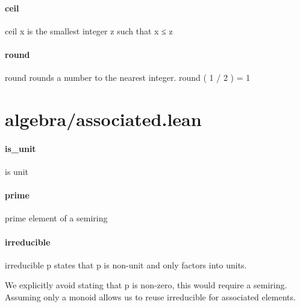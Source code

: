 \documentclass{article}
\begin{document}
\paragraph{ceil}
\par
\colorbox[RGB]{253,246,227}{{{{\color[RGB]{101, 123, 131} ceil x }}}} is the smallest integer 
\colorbox[RGB]{253,246,227}{{{{\color[RGB]{101, 123, 131} z }}}} such that 
\colorbox[RGB]{253,246,227}{{{{\color[RGB]{101, 123, 131} x  }}}{{{\color[RGB]{181, 137, 0} ≤ }}}{{{\color[RGB]{101, 123, 131}  z }}}}\paragraph{round}
\par
\colorbox[RGB]{253,246,227}{{{{\color[RGB]{101, 123, 131} round }}}} rounds a number to the nearest integer. 
\colorbox[RGB]{253,246,227}{{{{\color[RGB]{101, 123, 131} round ( }}}{{{\color[RGB]{108, 113, 196} 1 }}}{{{\color[RGB]{101, 123, 131}   }}}{{{\color[RGB]{181, 137, 0} / }}}{{{\color[RGB]{101, 123, 131}   }}}{{{\color[RGB]{108, 113, 196} 2 }}}{{{\color[RGB]{101, 123, 131} )  }}}{{{\color[RGB]{181, 137, 0} = }}}{{{\color[RGB]{101, 123, 131}   }}}{{{\color[RGB]{108, 113, 196} 1 }}}}\section{algebra/associated.lean}\paragraph{is\_unit}
\par
is unit
\paragraph{prime}
\par
prime element of a semiring
\paragraph{irreducible}
\par
\colorbox[RGB]{253,246,227}{{{{\color[RGB]{101, 123, 131} irreducible p }}}} states that 
\colorbox[RGB]{253,246,227}{{{{\color[RGB]{101, 123, 131} p }}}} is non-unit and only factors into units.
\par
We explicitly avoid stating that 
\colorbox[RGB]{253,246,227}{{{{\color[RGB]{101, 123, 131} p }}}} is non-zero, this would require a semiring. Assuming only a
monoid allows us to reuse irreducible for associated elements.
\end{document}
